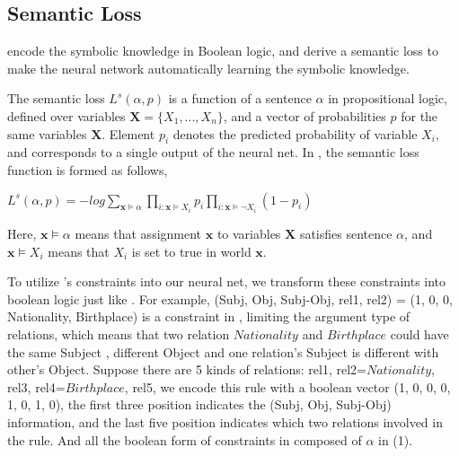 \subsection{Semantic Loss}
\cite{xu2017semantic}  encode the symbolic knowledge in Boolean logic, and derive a semantic loss to make the neural network automatically learning the symbolic knowledge. 

The semantic loss $L^{s}(\alpha, p)$ is a function of a sentence $\alpha$ in propositional logic, defined over variables $\bm X=\{X_1,...,X_n\}$, and a vector of probabilities $p$ for the same variables $\bm X$. Element $p_i$ denotes the predicted probability of variable $X_i$, and corresponds to a single output of the neural net. 
In \cite{xu2017semantic}, the semantic loss function is formed as follows,

\begin{center}
	$L^{s}(\alpha, p) = -log\sum\limits_{\bm x\models\alpha}\prod\limits_{i:\bm x\models X_i}p_i\prod\limits_{i:\bm x\models \neg X_i}(1-p_i)$
\end{center}

Here, $\bm x \models \alpha$ means that assignment $\bm x$ to variables $\bm X$ satisfies sentence $\alpha$, and $\bm x \models X_i$ means that $X_i$ is set to true in world $\bm x$. 

To utilize \cite{chen2014encoding}'s constraints into our neural net, we transform these constraints into boolean logic just like \cite{xu2017semantic}. For example, (Subj, Obj, Subj-Obj, rel1, rel2) = (1, 0, 0, Nationality, Birthplace) is a constraint in \cite{chen2014encoding}, limiting the argument type of relations, which means that two relation $ Nationality $ and $ Birthplace $ could have the same Subject , different Object and one relation's Subject is different with other's Object. Suppose there are 5 kinds of relations: rel1, rel2=$ Nationality $, rel3, rel4=$ Birthplace $, rel5, we encode this rule with a boolean vector (1, 0, 0, 0, 1, 0, 1, 0), the first three position indicates the (Subj, Obj, Subj-Obj) information, and the last five position indicates which two relations involved in the rule. And all the boolean form of constraints in \cite{chen2014encoding} composed of  $ \alpha $ in (1).


